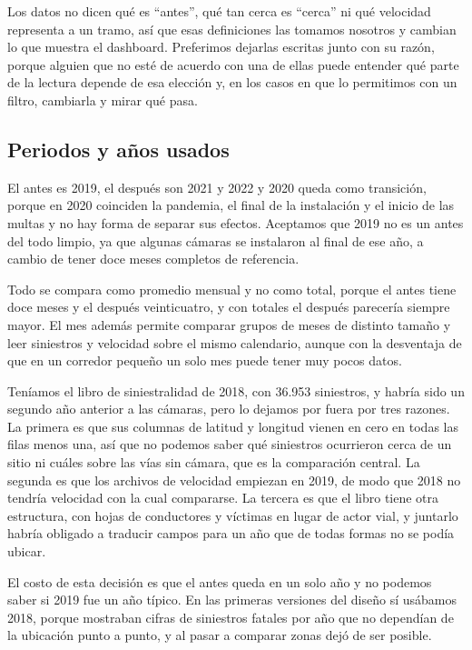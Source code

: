 \documentclass[10pt,a4paper]{article}
\begin{document}
Los datos no dicen qué es ``antes'', qué tan cerca es ``cerca'' ni qué velocidad representa a un tramo, así que esas definiciones las tomamos nosotros y cambian lo que muestra el dashboard. Preferimos dejarlas escritas junto con su razón, porque alguien que no esté de acuerdo con una de ellas puede entender qué parte de la lectura depende de esa elección y, en los casos en que lo permitimos con un filtro, cambiarla y mirar qué pasa.

\subsection{Periodos y años usados}

El antes es 2019, el después son 2021 y 2022 y 2020 queda como transición, porque en 2020 coinciden la pandemia, el final de la instalación y el inicio de las multas y no hay forma de separar sus efectos. Aceptamos que 2019 no es un antes del todo limpio, ya que algunas cámaras se instalaron al final de ese año, a cambio de tener doce meses completos de referencia.

Todo se compara como promedio mensual y no como total, porque el antes tiene doce meses y el después veinticuatro, y con totales el después parecería siempre mayor. El mes además permite comparar grupos de meses de distinto tamaño y leer siniestros y velocidad sobre el mismo calendario, aunque con la desventaja de que en un corredor pequeño un solo mes puede tener muy pocos datos.


Teníamos el libro de siniestralidad de 2018, con 36.953 siniestros, y habría sido un segundo año anterior a las cámaras, pero lo dejamos por fuera por tres razones. La primera es que sus columnas de latitud y longitud vienen en cero en todas las filas menos una, así que no podemos saber qué siniestros ocurrieron cerca de un sitio ni cuáles sobre las vías sin cámara, que es la comparación central. La segunda es que los archivos de velocidad empiezan en 2019, de modo que 2018 no tendría velocidad con la cual compararse. La tercera es que el libro tiene otra estructura, con hojas de conductores y víctimas en lugar de actor vial, y juntarlo habría obligado a traducir campos para un año que de todas formas no se podía ubicar.

El costo de esta decisión es que el antes queda en un solo año y no podemos saber si 2019 fue un año típico. En las primeras versiones del diseño sí usábamos 2018, porque mostraban cifras de siniestros fatales por año que no dependían de la ubicación punto a punto, y al pasar a comparar zonas dejó de ser posible.
\end{document}
